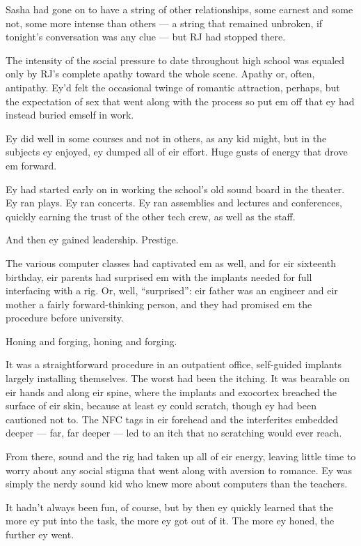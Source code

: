 Sasha had gone on to have a string of other relationships, some earnest and some not, some more intense than others — a string that remained unbroken, if tonight's conversation was any clue — but RJ had stopped there.

The intensity of the social pressure to date throughout high school was equaled only by RJ's complete apathy toward the whole scene. Apathy or, often, antipathy. Ey'd felt the occasional twinge of romantic attraction, perhaps, but the expectation of sex that went along with the process so put em off that ey had instead buried emself in work.

Ey did well in some courses and not in others, as any kid might, but in the subjects ey enjoyed, ey dumped all of eir effort. Huge gusts of energy that drove em forward.

Ey had started early on in working the school's old sound board in the theater. Ey ran plays. Ey ran concerts. Ey ran assemblies and lectures and conferences, quickly earning the trust of the other tech crew, as well as the staff.

And then ey gained leadership. Prestige.

The various computer classes had captivated em as well, and for eir sixteenth birthday, eir parents had surprised em with the implants needed for full interfacing with a rig. Or, well, ``surprised'': eir father was an engineer and eir mother a fairly forward-thinking person, and they had promised em the procedure before university.

Honing and forging, honing and forging.

It was a straightforward procedure in an outpatient office, self-guided implants largely installing themselves. The worst had been the itching. It was bearable on eir hands and along eir spine, where the implants and exocortex breached the surface of eir skin, because at least ey could scratch, though ey had been cautioned not to. The NFC tags in eir forehead and the interferites embedded deeper — far, far deeper — led to an itch that no scratching would ever reach.

From there, sound and the rig had taken up all of eir energy, leaving little time to worry about any social stigma that went along with aversion to romance. Ey was simply the nerdy sound kid who knew more about computers than the teachers.

It hadn't always been fun, of course, but by then ey quickly learned that the more ey put into the task, the more ey got out of it. The more ey honed, the further ey went.

